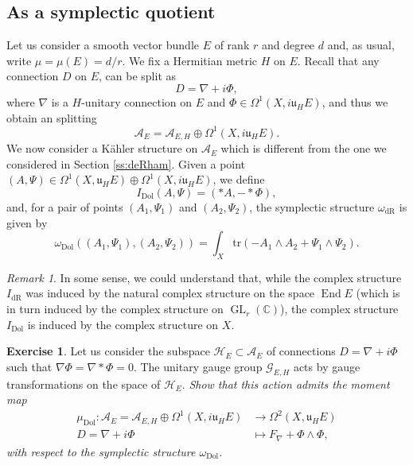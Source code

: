 \documentclass[12pt,a4paper]{amsbook}
\theoremstyle{remark} \newtheorem{rmk}[thm]{Remark}
\theoremstyle{definition} \newtheorem{defn}[thm]{Definition}
\theoremstyle{definition} \newtheorem{ex}[thm]{Example}
\theoremstyle{definition} \newtheorem{ej}{Exercise}
\newcommand{\C}{\mathbb C}
\newcommand{\cA}{\mathcal A}
\newcommand{\cH}{\mathcal H}
\newcommand{\cG}{\mathcal G}
\newcommand{\fu}{\mathfrak u}
\newcommand{\dR}{\mathrm{dR}}
\newcommand{\Dol}{\mathrm{Dol}}
\DeclareMathOperator{\End}{End}
\DeclareMathOperator{\GL}{GL}
\begin{document}
\subsection*{As a symplectic quotient}
Let us consider a smooth vector bundle $E$ of rank $r$ and degree $d$ and, as usual, write $\mu=\mu(E)=d/r$. We fix a Hermitian metric $H$ on $E$. Recall that any connection $D$ on $E$, can be split as
\begin{equation*}
D= \nabla + i\Phi,
\end{equation*}
where $\nabla$ is a  $H$-unitary connection on $E$ and $\Phi \in \Omega^{1}(X,i \mathfrak{u}_H E)$, and thus we obtain an splitting
\begin{equation*}
\cA_E = \cA_{E,H} \oplus \Omega^1(X,i \fu_H E).
\end{equation*}
We now consider a Kähler structure on $\cA_E$ which is different from the one we considered in Section \ref{ss:deRham}. Given a point $(A,\Psi) \in \Omega^1(X,\fu_H E) \oplus \Omega^1(X,i \fu_H E)$, we define
\begin{equation*}
I_{\Dol}(A,\Psi) = (*A, -*\Phi),
\end{equation*}
and, for a pair of points $(A_1,\Psi_1)$ and $(A_2,\Psi_2)$, the symplectic structure $\omega_{\dR}$ is given by
\begin{equation*}
\omega_{\Dol}((A_1,\Psi_1),(A_2,\Psi_2)) = \int_X \mathrm{tr} (-A_1 \wedge A_2 + \Psi_1 \wedge \Psi_2).
\end{equation*}

\begin{rmk}
In some sense, we could understand that, while the complex structure $I_{\dR}$ was induced by the natural complex structure on the space $\End E$ (which is in turn induced by the complex structure on $\GL_r(\C)$), the complex structure $I_{\Dol}$ is induced by the complex structure on $X$.
\end{rmk}

\begin{ej}
  Let us consider the subspace $\cH_E\subset \cA_E$ of connections $D=\nabla + i\Phi$ such that $\nabla\Phi=\nabla* \Phi = 0$.
The unitary gauge group $\cG_{E,H}$ acts by gauge transformations on the space of $\cH_E$.
\textit{Show that this action admits the moment map}
\begin{align*}
  \mu_{\Dol}: \cA_E = \cA_{E,H} \oplus \Omega^1(X,i \fu_H E) & \longrightarrow \Omega^2(X,\fu_H E) \\
 D=\nabla + i\Phi   & \longmapsto F_\nabla + \Phi \wedge \Phi,
\end{align*}
\textit{with respect to the symplectic structure $\omega_{\Dol}$.}
\end{ej}
\end{document}
